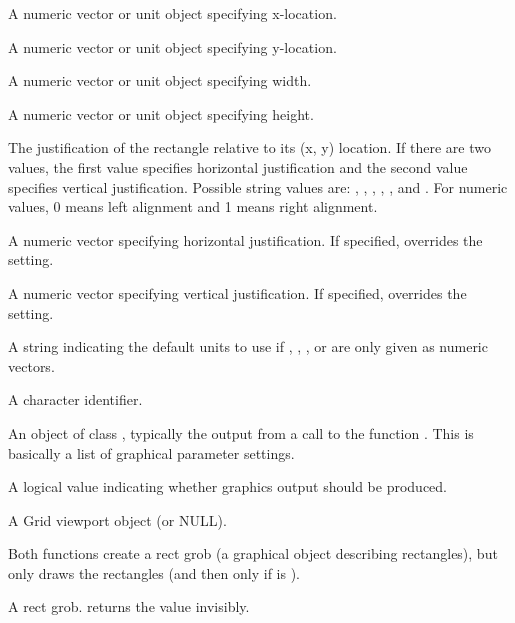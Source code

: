 \begin{Arguments}
\begin{ldescription}
\item[\code{x}] A numeric vector or unit object specifying x-location.
\item[\code{y}] A numeric vector or unit object specifying y-location.
\item[\code{width}] A numeric vector or unit object specifying width.
\item[\code{height}] A numeric vector or unit object specifying height.
\item[\code{just}] The justification of the rectangle 
relative to its (x, y) location.  If there are two values, the first
value specifies horizontal justification and the second value specifies
vertical justification.  Possible string values are: ,
, , , ,
and .  For numeric values, 0 means left alignment
and 1 means right alignment.

\item[\code{hjust}] A numeric vector specifying horizontal justification.
If specified, overrides the  setting.
\item[\code{vjust}] A numeric vector specifying vertical justification.
If specified, overrides the  setting.
\item[\code{default.units}] A string indicating the default units to use
if , , , or 
are only given as numeric vectors. 
\item[\code{name}]  A character identifier. 
\item[\code{gp}] An object of class , typically the output
from a call to the function .  This is basically
a list of graphical parameter settings.
\item[\code{draw}] A logical value indicating whether graphics output
should be produced.
\item[\code{vp}] A Grid viewport object (or NULL).
\end{ldescription}
\end{Arguments}
%
\begin{Details}\relax
Both functions create a rect grob (a graphical object describing
rectangles), but only 
draws the rectangles (and then only if  is ).

\end{Details}
%
\begin{Value}
A rect grob.   returns the value invisibly.
\end{Value}

